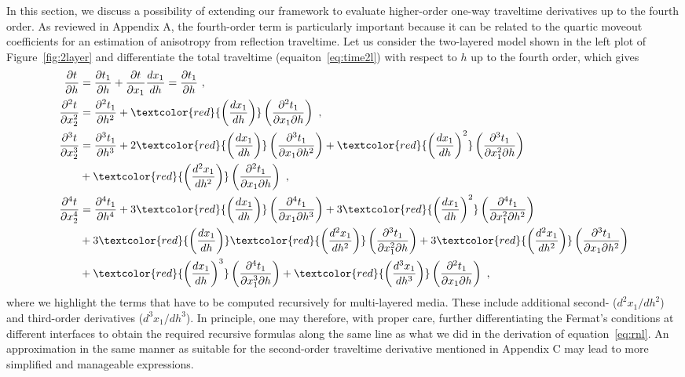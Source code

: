 In this section, we discuss a possibility of extending our framework to evaluate higher-order one-way traveltime derivatives up to the fourth order. As reviewed in Appendix A, the fourth-order term is particularly important because it can be related to the quartic moveout coefficients for an estimation of anisotropy from reflection traveltime. Let us consider the two-layered model shown in the left plot of Figure~\ref{fig:2layer} and differentiate the total traveltime (equaiton~\ref{eq:time2l}) with respect to $h$ up to the fourth order, which gives
\begin{align}
\frac{\partial t}{\partial h} & = \frac{\partial t_1}{\partial h} +  \frac{\partial t}{\partial x_1}  \frac{d x_1}{d h}   = \frac{\partial t_1}{\partial h}~, \\
\frac{\partial^2 t}{\partial x^2_2} & = \frac{\partial^2 t_1}{\partial h^2} + \textcolor{red}{\left( \frac{d x_1}{d h}\right)} \left(\frac{\partial^2 t_1}{\partial x_1 \partial h} \right) ~, \\
\nonumber
\frac{\partial^3 t}{\partial x^3_2} & = \frac{\partial^3 t_1}{\partial h^3} +  2\textcolor{red}{\left( \frac{d x_1}{d h}\right)} \left(\frac{\partial^3 t_1}{\partial x_1 \partial h^2} \right) +  \textcolor{red}{\left( \frac{d x_1}{d h}\right)^2} \left(\frac{ \partial^3 t_1}{\partial x_1^2 \partial h} \right)  \\
& +  \textcolor{red}{\left( \frac{d ^2x_1}{d h^2}\right)} \left(\frac{ \partial^2 t_1}{\partial x_1 \partial h} \right) ~, \\
\nonumber
\frac{\partial^4 t}{\partial x^4_2} & = \frac{\partial^4 t_1}{\partial h^4} + 3 \textcolor{red}{\left( \frac{d x_1}{d h}\right)} \left(\frac{\partial^4 t_1}{\partial x_1 \partial h^3} \right) +  3\textcolor{red}{\left( \frac{d x_1}{d h}\right)^2} \left(\frac{ \partial^4 t_1}{\partial x_1^2 \partial h^2} \right) \\
\nonumber
& +  3\textcolor{red}{\left( \frac{d x_1}{d h}\right)} \textcolor{red}{\left( \frac{d^2 x_1}{d h^2}\right)} \left(\frac{ \partial^3 t_1}{\partial x_1^2 \partial h} \right) +  3\textcolor{red}{\left( \frac{d^2 x_1}{d h^2}\right)} \left(\frac{ \partial^3 t_1}{\partial x_1 \partial h^2} \right) \\
& + \textcolor{red}{\left( \frac{d x_1}{d h}\right)^3} \left(\frac{\partial^4 t_1}{\partial x_1^3 \partial h} \right) +  \textcolor{red}{\left( \frac{d^3 x_1}{d h^3}\right)} \left(\frac{\partial^2 t_1}{\partial x_1 \partial h} \right)~,
\end{align}
where we highlight the terms that have to be computed recursively for multi-layered media. These include additional second- ($d^2 x_1 / d h^2$) and third-order derivatives ($d^3 x_1 / d h^3$). In principle, one may therefore, with proper care, further differentiating the Fermat's conditions at different interfaces to obtain the required recursive formulas along the same line as what we did in the derivation of equation~\ref{eq:rnl}. An approximation in the same manner as \cite{blias2006} suitable for the second-order traveltime derivative mentioned in Appendix C may lead to more simplified and manageable expressions. 

